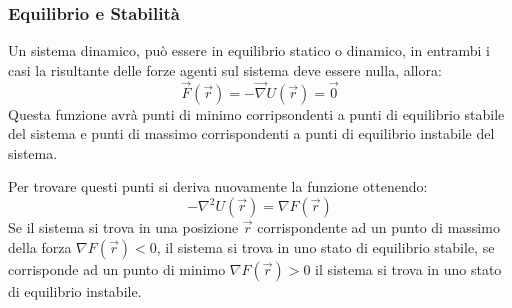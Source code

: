 \documentclass{article}
\numberwithin{equation}{subsection}
\begin{document}
\subsubsection{Equilibrio e Stabilità}
Un sistema dinamico, può essere in equilibrio statico o dinamico, 
in entrambi i casi la risultante delle forze agenti sul sistema 
deve essere nulla, allora:
\begin{equation*}
    \vec{F}(\vec{r})=-\vec{\nabla}U(\vec{r})=\vec{0}
\end{equation*}
Questa funzione avrà punti di minimo corripsondenti a 
punti di equilibrio stabile del sistema e punti di massimo 
corrispondenti a punti di equilibrio instabile del sistema. 


Per trovare questi punti si deriva nuovamente la funzione 
ottenendo:
\begin{equation*}
    -\nabla^{2}U(\vec{r})=\nabla F(\vec{r})
\end{equation*}
Se il sistema si trova in una posizione $\vec{r}$ corrispondente ad un punto di massimo della forza $\nabla F(\vec{r})<0$, il sistema si trova in uno stato di equilibrio stabile, 
se corrisponde ad un punto di minimo $\nabla F(\vec{r})>0$ il sistema si trova in uno stato di equilibrio instabile. 
\end{document}
